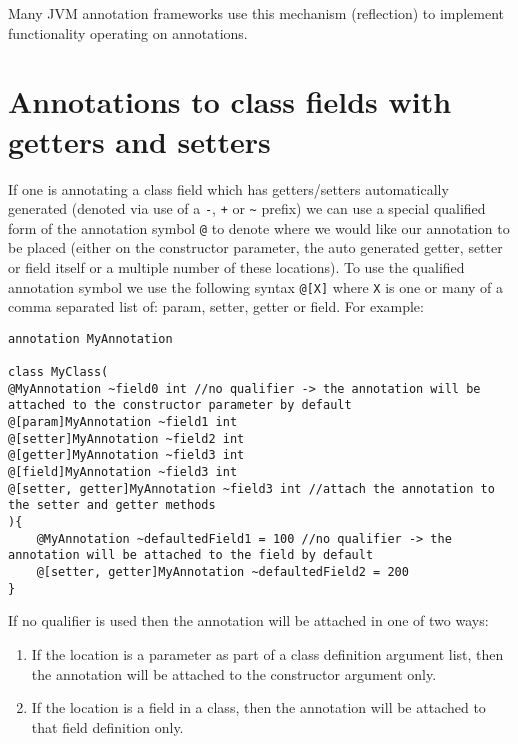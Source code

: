 \documentclass[conc-doc]{subfiles}
\begin{document}
Many JVM annotation frameworks use this mechanism (reflection) to implement functionality operating on annotations.

\section{Annotations to class fields with getters and setters}
If one is annotating a class field which has getters/setters automatically generated (denoted via use of a \lstinline{-}, \lstinline{+} or \lstinline{~} prefix) we can use a special qualified form of the annotation symbol \lstinline{@} to denote where we would like our annotation to be placed (either on the constructor parameter, the auto generated getter, setter or field itself or a multiple number of these locations). To use the qualified annotation symbol we use the following syntax \lstinline{@[X]} where \lstinline{X} is one or many of a comma separated list of: param, setter, getter or field. For example:

\begin{lstlisting}
annotation MyAnnotation

class MyClass(
@MyAnnotation ~field0 int //no qualifier -> the annotation will be attached to the constructor parameter by default
@[param]MyAnnotation ~field1 int
@[setter]MyAnnotation ~field2 int
@[getter]MyAnnotation ~field3 int
@[field]MyAnnotation ~field3 int
@[setter, getter]MyAnnotation ~field3 int //attach the annotation to the setter and getter methods
){
	@MyAnnotation ~defaultedField1 = 100 //no qualifier -> the annotation will be attached to the field by default
	@[setter, getter]MyAnnotation ~defaultedField2 = 200 
}
\end{lstlisting}

If no qualifier is used then the annotation will be attached in one of two ways:
\begin{enumerate}
	\item If the location is a parameter as part of a class definition argument list, then the annotation will be attached to the constructor argument only.
	\item If the location is a field in a class, then the annotation will be attached to that field definition only.
\end{enumerate}
\end{document}
